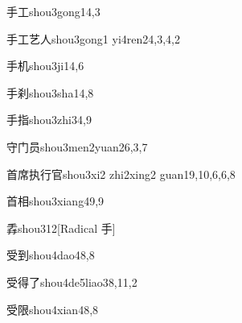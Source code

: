 \begin{verbete}{手工}{shou3gong1}{4,3}
\end{verbete}

\begin{verbete}{手工艺人}{shou3gong1 yi4ren2}{4,3,4,2}
\end{verbete}

\begin{verbete}{手机}{shou3ji1}{4,6}
\end{verbete}

\begin{verbete}{手刹}{shou3sha1}{4,8}
\end{verbete}

\begin{verbete}{手指}{shou3zhi3}{4,9}
\end{verbete}

\begin{verbete}{守门员}{shou3men2yuan2}{6,3,7}
\end{verbete}

\begin{verbete}{首席执行官}{shou3xi2 zhi2xing2 guan1}{9,10,6,6,8}
\end{verbete}

\begin{verbete}{首相}{shou3xiang4}{9,9}
\end{verbete}

\begin{verbete}{掱}{shou3}{12}[Radical 手]
\end{verbete}

\begin{verbete}{受到}{shou4dao4}{8,8}
\end{verbete}

\begin{verbete}{受得了}{shou4de5liao3}{8,11,2}
\end{verbete}

\begin{verbete}{受限}{shou4xian4}{8,8}
\end{verbete}

